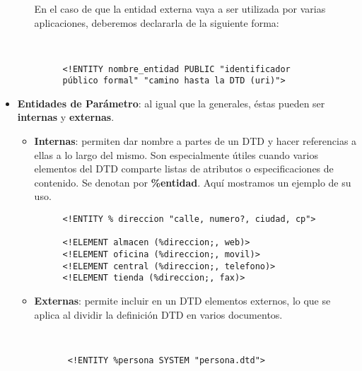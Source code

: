 \begin{itemize}
\begin{itemize}
     En el caso de que la entidad externa vaya a ser utilizada por varias aplicaciones, deberemos declararla de la siguiente forma:

         \begin{figure}[h]
         \begin{tcolorbox}[sharp corners, colback=yellow!30, colframe=white!20]
             \scriptsize
             \begin{verbatim}


<!ENTITY nombre_entidad PUBLIC "identificador público formal" "camino hasta la DTD (uri)">
             \end{verbatim}
         \end{tcolorbox}
     \end{figure}
     \end{itemize}

    \item \textbf{Entidades de Parámetro}: al igual que la generales, éstas pueden ser \textbf{internas} y \textbf{externas}.

    \begin{itemize}
        \item \textbf{Internas}: permiten dar nombre a partes de un DTD y hacer referencias a ellas a lo largo del mismo. Son especialmente útiles cuando varios elementos del DTD comparte listas de atributos o especificaciones de contenido. Se denotan por \textbf{\%entidad}. Aquí mostramos un ejemplo de su uso.

        \begin{figure}[h]
            \begin{tcolorbox}[sharp corners, colback=yellow!30, colframe=white!20]
                \scriptsize
                \begin{verbatim}
<!ENTITY % direccion "calle, numero?, ciudad, cp">

<!ELEMENT almacen (%direccion;, web)>
<!ELEMENT oficina (%direccion;, movil)>
<!ELEMENT central (%direccion;, telefono)>
<!ELEMENT tienda (%direccion;, fax)>
                \end{verbatim}
            \end{tcolorbox}
        \end{figure}

    \item \textbf{Externas}: permite incluir en un DTD elementos externos, lo que se aplica al dividir la definición DTD en varios documentos.

            \begin{figure}[h]
        \begin{tcolorbox}[sharp corners, colback=yellow!30, colframe=white!20]
            \scriptsize
            \begin{verbatim}


 <!ENTITY %persona SYSTEM "persona.dtd">
            \end{verbatim}
        \end{tcolorbox}
    \end{figure}
    \end{itemize}
\end{itemize}

